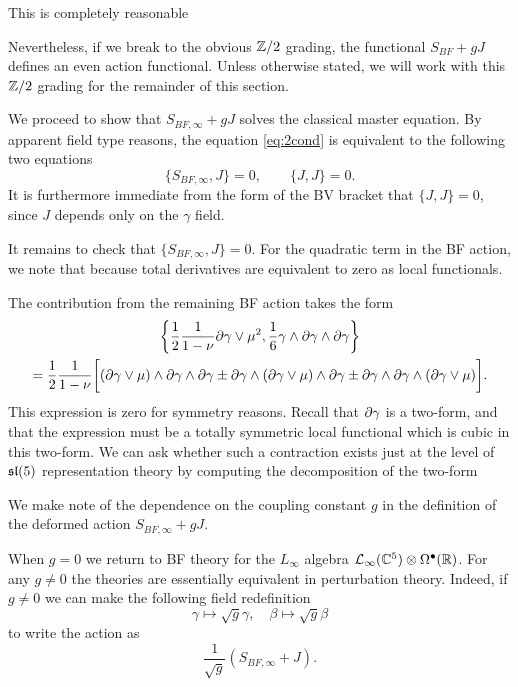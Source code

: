 This is completely reasonable 


Nevertheless, if we break to the obvious $\mathbb Z/2$ grading, the functional $S_{BF} + g J$ defines an even action functional.
Unless otherwise stated, we will work with this $\mathbb Z/2$ grading for the remainder of this section.

\parsec[]
We proceed to show that $S_{BF,\infty} + g J$ solves the classical master equation.
By apparent field type reasons, the equation \eqref{eq:2cond} is equivalent to the following two equations
\[
\{S_{BF,\infty}, J\} = 0, \qquad \{J,J\} = 0.
\] 
It is furthermore immediate from the form of the BV bracket that $\{J,J\} = 0$, since $J$ depends only on the $\gamma$ field. 

It remains to check that $\{S_{BF,\infty},J\} = 0$. 
For the quadratic term in the BF action, we note that 
  because total derivatives are equivalent to zero as local functionals. 
  
The contribution from the remaining BF action takes the form
\begin{multline}
    \left\{ \frac12 \frac{1}{1-\nu} \partial\gamma \vee \mu^2, \frac16 \gamma \wedge \partial\gamma \wedge \partial \gamma \right\} \\ = \frac12 \frac{1}{1-\nu} \bigg[ (\partial\gamma\vee\mu) \wedge \partial\gamma \wedge \partial \gamma \pm \partial\gamma \wedge (\partial\gamma\vee\mu) \wedge \partial \gamma \pm \partial\gamma \wedge \partial \gamma \wedge (\partial\gamma\vee\mu) \bigg].
\end{multline}
This expression is zero for symmetry reasons. Recall that $\partial\gamma$ is a two-form, and that the expression must be a totally symmetric local functional which is cubic in this two-form. We can ask whether such a  contraction exists just at the level of $\mathfrak{sl}(5)$ representation theory by computing the decomposition of the two-form  

\parsec[s:coupling]

We make note of the dependence on the coupling constant $g$ in the definition of the deformed action $S_{BF,\infty} + g J$. 

When $g = 0$ we return to BF theory for the $L_\infty$ algebra $\mathcal L_\infty(\mathbb C^5) \otimes \Omega^\bullet(\mathbb R)$. 
For any $g \ne 0$ the theories are essentially equivalent in perturbation theory. 
Indeed, if $g \ne 0$ we can make the following field redefinition 
\[
\gamma \mapsto \sqrt{g} \gamma, \quad \beta \mapsto \sqrt{g} \beta 
\]
to write the action as 
\[
\frac{1}{\sqrt{g}} \left(S_{BF,\infty} + J \right)  .
\]

